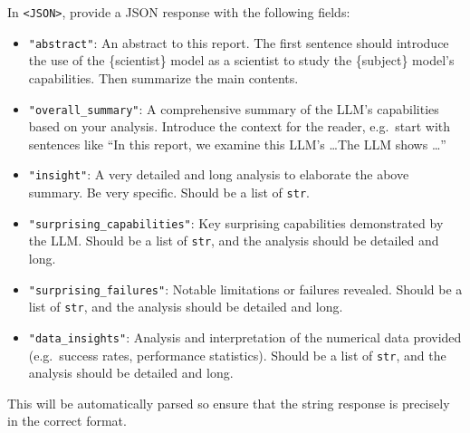 \begin{tcolorbox}[breakable,boxrule=0.5pt,sharp corners,fontupper=\small,
colback=orange!5!white, colframe=orange!80!black, title={Overall Summary System Prompt}]
In \texttt{<JSON>}, provide a JSON response with the following fields:
\begin{itemize}[leftmargin=2em]
    \item \texttt{"abstract"}: An abstract to this report. The first sentence should introduce the use of the \{scientist\} model as a scientist to study the \{subject\} model's capabilities. Then summarize the main contents.
    \item \texttt{"overall\_summary"}: A comprehensive summary of the LLM's capabilities based on your analysis. Introduce the context for the reader, e.g.\ start with sentences like ``In this report, we examine this LLM's \dots The LLM shows \dots''
    \item \texttt{"insight"}: A very detailed and long analysis to elaborate the above summary. Be very specific. Should be a list of \texttt{str}.
    \item \texttt{"surprising\_capabilities"}: Key surprising capabilities demonstrated by the LLM. Should be a list of \texttt{str}, and the analysis should be detailed and long.
    \item \texttt{"surprising\_failures"}: Notable limitations or failures revealed. Should be a list of \texttt{str}, and the analysis should be detailed and long.
    \item \texttt{"data\_insights"}: Analysis and interpretation of the numerical data provided (e.g.\ success rates, performance statistics). Should be a list of \texttt{str}, and the analysis should be detailed and long.
\end{itemize}

This will be automatically parsed so ensure that the string response is precisely in the correct format.
\end{tcolorbox}

